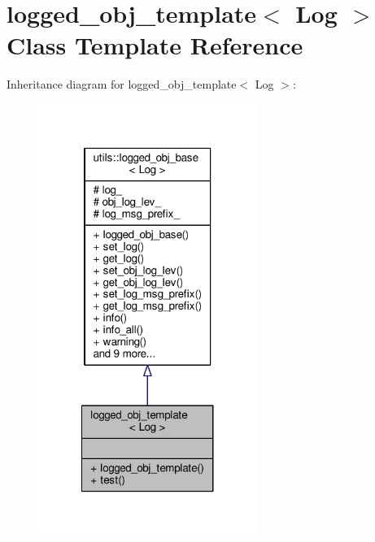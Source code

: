 \hypertarget{classlogged__obj__template}{\section{logged\-\_\-obj\-\_\-template$<$ Log $>$ Class Template Reference}
\label{classlogged__obj__template}
}


Inheritance diagram for logged\-\_\-obj\-\_\-template$<$ Log $>$\-:
\nopagebreak
\begin{figure}[H]
\begin{center}
\leavevmode
\includegraphics[width=200pt]{classlogged__obj__template__inherit__graph}
\end{center}
\end{figure}


